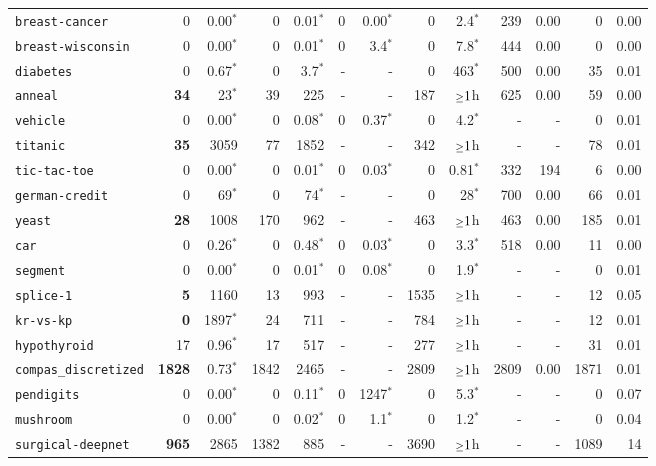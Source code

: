 \begin{tabular}{lrrrrrrrrrrrr}
\texttt{breast-cancer} & 0 & 0.00$^*$ & 0 & 0.01$^*$ & 0 & 0.00$^*$ & 0 & 2.4$^*$ & 239 & 0.00 & 0 & 0.00\\
\texttt{breast-wisconsin} & 0 & 0.00$^*$ & 0 & 0.01$^*$ & 0 & 3.4$^*$ & 0 & 7.8$^*$ & 444 & 0.00 & 0 & 0.00\\
\texttt{diabetes} & 0 & 0.67$^*$ & 0 & 3.7$^*$ & - & - & 0 & 463$^*$ & 500 & 0.00 & 35 & 0.01\\
\texttt{anneal} & \textbf{34} & 23$^*$ & 39 & 225 & - & - & 187 & $\mathsmaller{\geq}1$h & 625 & 0.00 & 59 & 0.00\\
\texttt{vehicle} & 0 & 0.00$^*$ & 0 & 0.08$^*$ & 0 & 0.37$^*$ & 0 & 4.2$^*$ & - & - & 0 & 0.01\\
\texttt{titanic} & \textbf{35} & 3059 & 77 & 1852 & - & - & 342 & $\mathsmaller{\geq}1$h & - & - & 78 & 0.01\\
\texttt{tic-tac-toe} & 0 & 0.00$^*$ & 0 & 0.01$^*$ & 0 & 0.03$^*$ & 0 & 0.81$^*$ & 332 & 194 & 6 & 0.00\\
\texttt{german-credit} & 0 & 69$^*$ & 0 & 74$^*$ & - & - & 0 & 28$^*$ & 700 & 0.00 & 66 & 0.01\\
\texttt{yeast} & \textbf{28} & 1008 & 170 & 962 & - & - & 463 & $\mathsmaller{\geq}1$h & 463 & 0.00 & 185 & 0.01\\
\texttt{car} & 0 & 0.26$^*$ & 0 & 0.48$^*$ & 0 & 0.03$^*$ & 0 & 3.3$^*$ & 518 & 0.00 & 11 & 0.00\\
\texttt{segment} & 0 & 0.00$^*$ & 0 & 0.01$^*$ & 0 & 0.08$^*$ & 0 & 1.9$^*$ & - & - & 0 & 0.01\\
\texttt{splice-1} & \textbf{5} & 1160 & 13 & 993 & - & - & 1535 & $\mathsmaller{\geq}1$h & - & - & 12 & 0.05\\
\texttt{kr-vs-kp} & \textbf{0} & 1897$^*$ & 24 & 711 & - & - & 784 & $\mathsmaller{\geq}1$h & - & - & 12 & 0.01\\
\texttt{hypothyroid} & 17 & 0.96$^*$ & 17 & 517 & - & - & 277 & $\mathsmaller{\geq}1$h & - & - & 31 & 0.01\\
\texttt{compas\_discretized} & \textbf{1828} & 0.73$^*$ & 1842 & 2465 & - & - & 2809 & $\mathsmaller{\geq}1$h & 2809 & 0.00 & 1871 & 0.01\\
\texttt{pendigits} & 0 & 0.00$^*$ & 0 & 0.11$^*$ & 0 & 1247$^*$ & 0 & 5.3$^*$ & - & - & 0 & 0.07\\
\texttt{mushroom} & 0 & 0.00$^*$ & 0 & 0.02$^*$ & 0 & 1.1$^*$ & 0 & 1.2$^*$ & - & - & 0 & 0.04\\
\texttt{surgical-deepnet} & \textbf{965} & 2865 & 1382 & 885 & - & - & 3690 & $\mathsmaller{\geq}1$h & - & - & 1089 & 14\\

\end{tabular}
